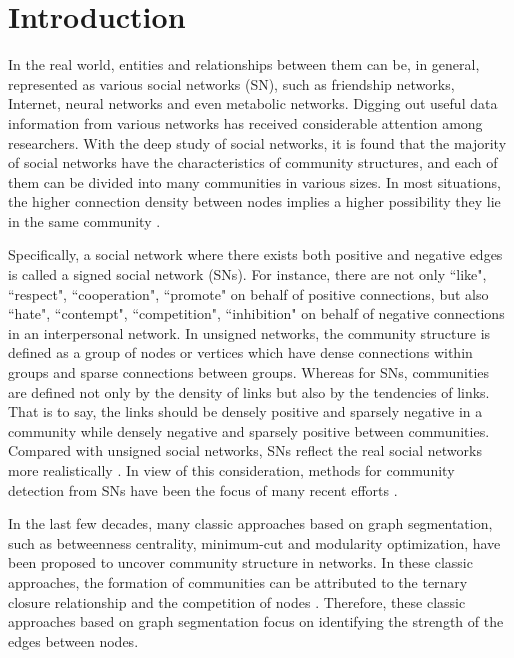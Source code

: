 \documentclass[10pt, journal]{IEEEtran}
\begin{document}
\section{Introduction} \label{section:introduction}
In the real world, entities and relationships between them can be, in general, represented as various social networks (SN), such as friendship networks, Internet, neural networks and even
metabolic networks. Digging out useful data information from various networks has received considerable attention among researchers. With the deep study of social networks, it is found that the majority of social networks have the characteristics of community structures, and each of them can be divided into many communities in various sizes. In most situations, the higher connection density between nodes implies a higher possibility they lie in the same community \cite{newman2001structure,girvan2002community,radicchi2004defining,dinh2015effective}.


Specifically, a social network where there exists both positive and negative edges is called a signed social network (SNs). For instance, there are not only ``like", ``respect", ``cooperation", ``promote" on behalf of positive connections, but also ``hate", ``contempt", ``competition", ``inhibition" on behalf of negative connections in an interpersonal network. In unsigned networks, the community structure is defined as a group of nodes or vertices which have dense connections within groups and sparse connections between groups. Whereas for SNs, communities are defined not only by the density of links but also by the tendencies of links. That is to say, the links should be densely positive and sparsely negative in a community while densely negative and sparsely positive between communities. Compared with unsigned social networks, SNs reflect the real social networks more realistically \cite{wu2016partition}. In view of this consideration, methods for community detection from SNs have been the focus of many recent efforts \cite{newman2004fast,lancichinetti2008benchmark,gulikers2017spectral,pizzuti2012multiobjective,newman2016community,zhang2016community}.

In the last few decades, many classic approaches based on graph segmentation, such as betweenness centrality, minimum-cut and modularity optimization, have been proposed to uncover community structure in networks.  In these classic approaches, the formation of communities can be attributed to the ternary closure relationship and the competition of nodes \cite{felzenszwalb2004efficient,su2015quadratic}. Therefore, these classic approaches based on graph segmentation focus on identifying the strength of the edges between nodes.
\end{document}
